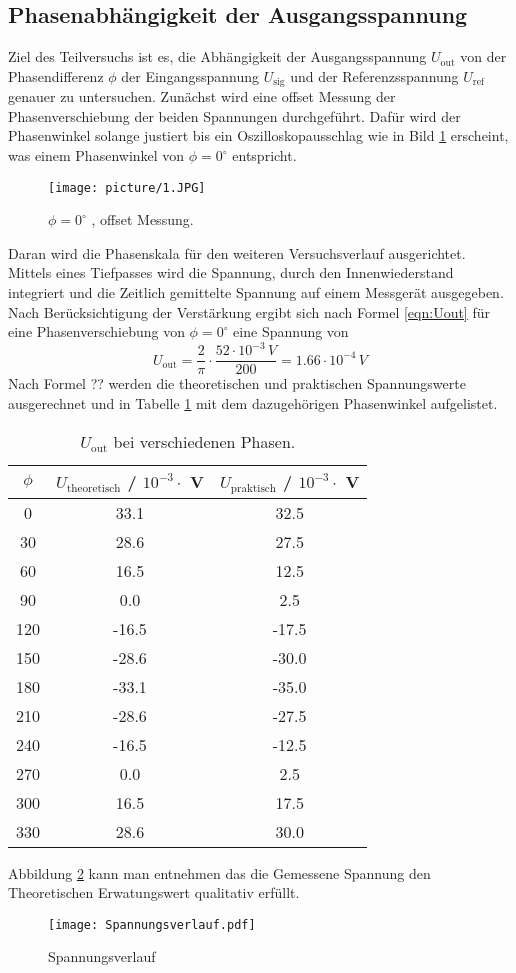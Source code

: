 \subsection{Phasenabhängigkeit der Ausgangsspannung}
Ziel des Teilversuchs ist es, die Abhängigkeit der Ausgangsspannung $U_{\text{out}}$ von der Phasendifferenz $\phi$ der Eingangsspannung $U_{\text{sig}}$ und der Referenzsspannung $U_{\text{ref}}$ genauer zu untersuchen. Zunächst wird eine offset Messung der Phasenverschiebung der beiden Spannungen durchgeführt. Dafür wird der Phasenwinkel solange justiert bis ein Oszilloskopausschlag wie in Bild \ref{fig:phi0} erscheint, was einem Phasenwinkel von $\phi = 0^{\circ}$ entspricht.
\begin{figure}
  \centering
  \texttt{[image: picture/1.JPG]}
  \caption{$\phi = 0^{\circ}$ , offset Messung.}
  \label{fig:phi0}
\end{figure}
Daran wird die Phasenskala für den weiteren Versuchsverlauf ausgerichtet. Mittels eines Tiefpasses wird die Spannung, durch den Innenwiederstand integriert und die Zeitlich gemittelte Spannung auf einem Messgerät ausgegeben. Nach Berücksichtigung der Verstärkung ergibt sich nach Formel \ref{eqn:Uout} für eine Phasenverschiebung von $\phi = 0^{\circ}$ eine Spannung von
\begin{equation}
  U_{\text{out}} = \frac{2}{\pi} \cdot \frac{52 \cdot 10^{-3} \, V}{200} = 1.66 \cdot 10^{-4} \, V
  \label{eqn:Uout}
\end{equation}
Nach Formel ?? werden die theoretischen und praktischen Spannungswerte ausgerechnet und in Tabelle \ref{tab:Uphase} mit dem dazugehörigen Phasenwinkel aufgelistet.
\begin{table}
  \centering
  \begin{tabular}{c c c}
    \toprule
    $\phi$ & $U_{\text{theoretisch}}$ / $10^{-3} \cdot $ V & $U_{\text{praktisch}}$ / $10^{-3} \cdot $ V \\
    \midrule
    0	  &  33.1  &  32.5	\\
    30	&  28.6  &  27.5	\\
    60	&  16.5  &  12.5	\\
    90	&  0.0 	 &   2.5	\\
    120	& -16.5  & -17.5	\\
    150	& -28.6  & -30.0	\\
    180	& -33.1  & -35.0	\\
    210	& -28.6  & -27.5	\\
    240	& -16.5  & -12.5	\\
    270	&  0.0 	 &  2.5	 	\\
    300	&  16.5  &  17.5	\\
    330	&  28.6	 &  30.0	\\
  \end{tabular}
  \caption{$U_{\text{out}}$ bei verschiedenen Phasen.}
  \label{tab:Uphase}
\end{table}
Abbildung \ref{fig:Spannungsverlauf} kann man entnehmen das die Gemessene Spannung den Theoretischen Erwatungswert qualitativ erfüllt.
\begin{figure}
  \centering
  \texttt{[image: Spannungsverlauf.pdf]}
  \caption{Spannungsverlauf}
  \label{fig:Spannungsverlauf}
\end{figure}
